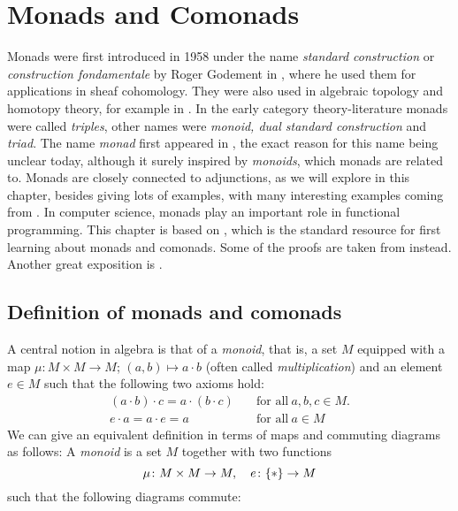 \chapter{Monads and Comonads}
Monads were first introduced in 1958 under the name \textit{standard construction} or \textit{construction fondamentale} 
by Roger Godement in \cite[Appendix,3.]{godement}, where he used them for applications in sheaf cohomology. 
They were also used in algebraic topology and homotopy theory, for example in \cite{huber}.
In the early category theory-literature monads were called \textit{triples}, other names were
\textit{monoid, dual standard construction} and \textit{triad}.
The name \textit{monad} first appeared in \cite{benabou}, the exact reason for this name being unclear today,
although it surely inspired by \textit{monoids}, which monads are related to.
Monads are closely connected to adjunctions, as we will explore in this chapter, besides giving lots of examples, 
with many interesting examples coming from \cite{perrone}.
In computer science, monads play an important role in functional programming.
This chapter is based on \cite[Chapter VI]{maclane}, which is
the standard resource for first learning about monads and comonads. Some of the proofs are
taken from \cite[Chapter II.3]{monoidaltopology} instead. Another great exposition is
\cite[Chapter 5]{perrone}.
\section{Definition of monads and comonads}
A central notion in algebra is that of a \textit{monoid},
that is, a set $M$ equipped with a map 
$\mu \colon M \times M \to M$; $(a,b) \mapsto a \cdot b$ 
(often called \textit{multiplication}) and an element $e \in M$
such that the following two axioms hold:
\begin{align}
    \label{eq: associativity for a monoid}  \tag{associativity} 
    (a \cdot b) \cdot c = a \cdot (b \cdot c) 
    \quad &\text{for all} \ a,b,c \in M. \\
    \label{eq: identity element for a monoid} \tag{identity element}
    e \cdot a = a \cdot e = a \quad &\text{for all} \ a \in M 
\end{align}
We can give an equivalent definition in terms of maps and commuting diagrams as follows:
A \textit{monoid} is a set $M$ together with two functions 
\[
    \mu \colon M \times M \to M, \quad 
    e \colon \{\ast\} \to M
\]
such that the following diagrams commute: \\

